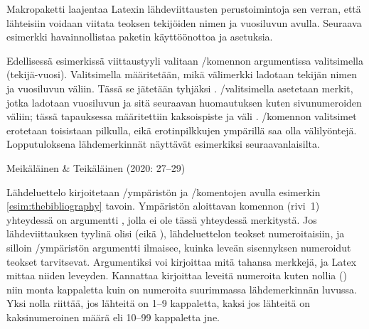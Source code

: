 Makropaketti  laajentaa Latexin
lähdeviittausten perustoimintoja sen verran, että lähteisiin voidaan
viitata teoksen tekijöiden nimen ja vuosiluvun avulla. Seuraava
esimerkki havainnollistaa paketin käyttöönottoa ja asetuksia.

\begin{koodilohkosis}
  \usepackage{natbib}
\end{koodilohkosis}

Edellisessä esimerkissä viittaustyyli valitaan \-/komennon argumentissa valitsimella
 (tekijä\--vuosi). Valitsimella 
määritetään, mikä välimerkki ladotaan tekijän nimen ja vuosiluvun
väliin. Tässä se jätetään tyhjäksi \koodi{\{\}}.
\-/valitsimella asetetaan merkit, jotka ladotaan
vuosiluvun ja sitä seuraavan huomautuksen kuten sivunumeroiden väliin;
tässä tapauksessa määritettiin kaksoispiste ja väli \koodi{\{:~\}}.
\-/komennon valitsimet erotetaan
toisistaan pilkulla, eikä erotinpilkkujen ympärillä saa olla
välilyöntejä. Lopputuloksena lähdemerkinnät näyttävät esimerkiksi
seuraavanlaisilta.

\pagebreak[3]

\begin{koodilohkosis}
  \citet*[27--29]{johdatus} %
\end{koodilohkosis}

\begin{tulossis}
  Meikäläinen \& Teikäläinen (2020: 27--29)
\end{tulossis}

Lähdeluettelo kirjoitetaan \-/ympäristön ja
\-/komentojen avulla esimerkin
\ref{esim:thebibliography} tavoin. Ympäristön aloittavan komennon
(rivi~1) yhteydessä on argumentti , jolla ei ole tässä
yhteydessä merkitystä. Jos lähdeviittauksen tyylinä olisi
 (eikä ), lähdeluettelon teokset
numeroitaisiin, ja silloin \-/ympäristön
argumentti ilmaisee, kuinka leveän sisennyksen numeroidut teokset
tarvitsevat. Argumentiksi voi kirjoittaa mitä tahansa merkkejä, ja Latex
mittaa niiden leveyden. Kannattaa kirjoittaa leveitä numeroita kuten
nollia () niin monta kappaletta kuin on numeroita suurimmassa
lähdemerkinnän luvussa. Yksi nolla riittää, jos lähteitä on 1--9
kappaletta, kaksi jos lähteitä on kaksinumeroinen määrä eli 10--99
kappaletta jne.

